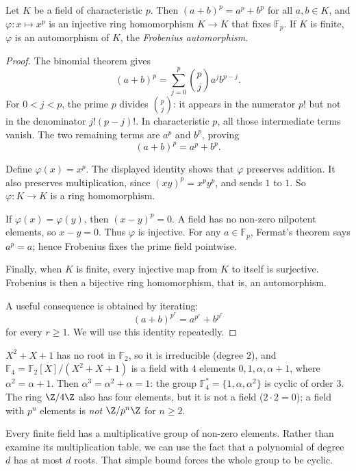 \begin{lemma}[Frobenius]\label{lem:frob}
Let $K$ be a field of characteristic $p$. Then $(a+b)^p=a^p+b^p$ for all $a,b\in K$, and $\varphi:x\mapsto x^p$ is an injective ring homomorphism $K\to K$ that fixes $\mathbb F_p$. If $K$ is finite, $\varphi$ is an automorphism of $K$, the \emph{Frobenius automorphism}.
\end{lemma}
\begin{proof}
The binomial theorem gives
\[
(a+b)^p
=\sum_{j=0}^p\binom pj a^jb^{p-j}.
\]
For $0<j<p$, the prime $p$ divides
$\binom pj$: it appears in the numerator
$p!$ but not in the denominator
$j!(p-j)!$. In characteristic $p$,
all those intermediate terms vanish.
The two remaining terms are $a^p$
and $b^p$, proving
\[
\boxed{(a+b)^p=a^p+b^p}.
\]

Define $\varphi(x)=x^p$.
The displayed identity shows that
$\varphi$ preserves addition.
It also preserves multiplication,
since $(xy)^p=x^py^p$, and sends
$1$ to $1$. So $\varphi:K\to K$
is a ring homomorphism.

If $\varphi(x)=\varphi(y)$,
then $(x-y)^p=0$. A field has no
non-zero nilpotent elements, so
$x-y=0$. Thus $\varphi$ is injective.
For any $a\in\mathbb F_p$,
Fermat's theorem says $a^p=a$;
hence Frobenius fixes the prime
field pointwise.

Finally, when $K$ is finite,
every injective map from $K$ to itself
is surjective. Frobenius is then a
bijective ring homomorphism, that is,
an automorphism.

A useful consequence is obtained
by iterating:
\[
(a+b)^{p^r}=a^{p^r}+b^{p^r}
\]
for every $r\ge1$. We will use
this identity repeatedly.
\end{proof}

\begin{example}\label{ex:f4}
$X^2+X+1$ has no root in $\mathbb F_2$, so it is irreducible (degree $2$), and $\mathbb F_4=\mathbb F_2[X]/(X^2+X+1)$ is a field with $4$ elements $0,1,\alpha,\alpha+1$, where $\alpha^2=\alpha+1$. Then $\alpha^3=\alpha^2+\alpha=1$: the group $\mathbb F_4^*=\{1,\alpha,\alpha^2\}$ is cyclic of order $3$. The ring $\Z/4\Z$ also has four elements, but it is not a field ($2\cdot2=0$); a field with $p^n$ elements is \emph{not} $\Z/p^n\Z$ for $n\ge2$.
\end{example}

Every finite field has a multiplicative group of non-zero elements. Rather than examine its multiplication table, we can use the fact that a polynomial of degree $d$ has at most $d$ roots. That simple bound forces the whole group to be cyclic.

